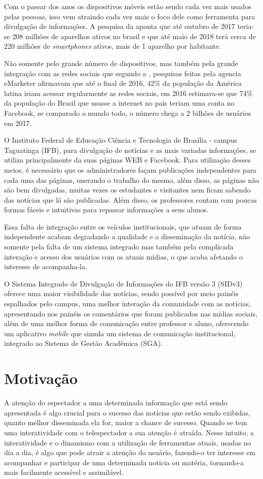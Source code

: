 Com o passar dos anos os dispositivos móveis estão sendo cada vez mais usados pelas pessoas, isso vem atraindo cada vez mais o foco dele como ferramenta para divulgação de informações. A pesquisa da \cite{fgv2017} aponta que até outubro de 2017 teria-se 208 milhões de aparelhos ativos no brasil e que até maio de 2018 terá cerca de 220 milhões de \textit{smartphones} ativos, mais de 1 aparelho por habitante. 

Não somente pelo grande número de dispositivos, mas também pela grande integração com as redes sociais que segundo a \cite{forbes2016}, pesquisas feitas pela agencia eMarketer afirmavam que até o final de 2016, 42\% da população da América latina iriam acessar regularmente as redes sociais, em 2016 estimava-se que 74\% da população do Brasil que usasse a internet no pais teriam uma conta no Facebook, se comparado o mundo todo, o número chega a 2 bilhões de usuários em 2017. 

O Instituto Federal de Educação Ciência e Tecnologia de Brasília - campus Taguatinga (IFB), para divulgação de notícias e as mais variadas informações, se utiliza principalmente da suas páginas WEB e Facebook. Para utilização desses meios, é necessário que os administradores façam publicações independentes para cada uma das páginas, onerando o trabalho do mesmo, além disso, as páginas não são bem divulgadas, muitas vezes os estudantes e visitantes nem ficam sabendo das notícias que lá são publicadas. Além disso, os professores contam com poucas formas fáceis e intuitivas para repassar informações a seus alunos.

Essa falta de integração entre os veículos institucionais, que atuam de forma independente acabam degradando a qualidade e a disseminação da notícia, não somente pela falta de um sistema integrado mas também pela complicada interação e acesso dos usuários com as atuais mídias, o que acaba afetando o interesse de acompanha-la.

O Sistema Integrado de Divulgação de Informações do IFB versão 3 (SIDv3) oferece uma maior visibilidade das notícias, sendo possível por meio painéis espalhados pelo campus, uma melhor interação da comunidade com as notícias, apresentando nos painéis os comentários que foram publicados nas mídias sociais, além de uma melhor forma de comunicação entre professor e aluno, oferecendo um aplicativo \textit{mobile} que simula um sistema de comunicação institucional, integrado ao Sistema de Gestão Acadêmica (SGA).

\section{Motivação}
A atenção do espectador a uma determinada informação que está sendo apresentada é algo crucial para o sucesso das notícias que estão sendo exibidas, quanto melhor disseminada ela for, maior a chance de sucesso. Quando se tem uma interatividade com o telespectador a sua atenção é atraída. Nesse intuito, a interatividade e o dinamismo com a utilização de ferramentas atuais, usadas no dia a dia, é algo que pode atrair a atenção do usuário, fazendo-o ter interesse em acompanhar e participar de uma determinada noticia ou matéria, tornando-a mais facilmente acessível e assimilável. 

